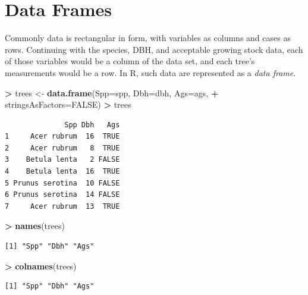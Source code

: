 \documentclass[]{krantz}
\makeatletter
\newenvironment{Shaded}{\begin{snugshade}}{\end{snugshade}}
\newcommand{\KeywordTok}[1]{\textcolor[rgb]{0.27,0.27,0.27}{\textbf{#1}}}
\newcommand{\DataTypeTok}[1]{\textcolor[rgb]{0.27,0.27,0.27}{#1}}
\newcommand{\StringTok}[1]{\textcolor[rgb]{0.5,0.5,0.5}{#1}}
\newcommand{\OtherTok}[1]{\textcolor[rgb]{0.37,0.37,0.37}{#1}}
\newcommand{\OperatorTok}[1]{\textcolor[rgb]{0.43,0.43,0.43}{\textbf{#1}}}
\newcommand{\NormalTok}[1]{#1}
\newenvironment{kframe}{%
\medskip{}
\setlength{\fboxsep}{.8em}
 \def\at@end@of@kframe{}%
 \ifinner\ifhmode%
  \def\at@end@of@kframe{\end{minipage}}%
  \begin{minipage}{\columnwidth}%
 \fi\fi%
 \def\FrameCommand##1{\hskip\@totalleftmargin \hskip-\fboxsep
 \colorbox{shadecolor}{##1}\hskip-\fboxsep
     \hskip-\linewidth \hskip-\@totalleftmargin \hskip\columnwidth}%
 \MakeFramed {\advance\hsize-\width
   \@totalleftmargin\z@ \linewidth\hsize
   \@setminipage}}%
 {\par\unskip\endMakeFramed%
 \at@end@of@kframe}
\renewenvironment{Shaded}{\begin{kframe}}{\end{kframe}}
\theoremstyle{definition}
\theoremstyle{definition}
\theoremstyle{definition}
\theoremstyle{remark}
\makeatother
\begin{document}
\section{Data Frames}\label{data-frames}

Commonly data is rectangular in form, with variables as columns and
cases as rows. Continuing with the species, DBH, and acceptable growing
stock data, each of those variables would be a column of the data set,
and each tree's measurements would be a row. In R, such data are
represented as a \emph{data frame}.

\begin{Shaded}
\begin{Highlighting}[]
\OperatorTok{>}\StringTok{ }\NormalTok{trees <-}\StringTok{ }\KeywordTok{data.frame}\NormalTok{(}\DataTypeTok{Spp=}\NormalTok{spp, }\DataTypeTok{Dbh=}\NormalTok{dbh, }\DataTypeTok{Ags=}\NormalTok{ags, }
\OperatorTok{+}\StringTok{                     }\DataTypeTok{stringsAsFactors=}\OtherTok{FALSE}\NormalTok{)}
\OperatorTok{>}\StringTok{ }\NormalTok{trees}
\end{Highlighting}
\end{Shaded}

\begin{verbatim}
              Spp Dbh   Ags
1     Acer rubrum  16  TRUE
2     Acer rubrum   8  TRUE
3    Betula lenta   2 FALSE
4    Betula lenta  16  TRUE
5 Prunus serotina  10 FALSE
6 Prunus serotina  14 FALSE
7     Acer rubrum  13  TRUE
\end{verbatim}

\begin{Shaded}
\begin{Highlighting}[]
\OperatorTok{>}\StringTok{ }\KeywordTok{names}\NormalTok{(trees)}
\end{Highlighting}
\end{Shaded}

\begin{verbatim}
[1] "Spp" "Dbh" "Ags"
\end{verbatim}

\begin{Shaded}
\begin{Highlighting}[]
\OperatorTok{>}\StringTok{ }\KeywordTok{colnames}\NormalTok{(trees)}
\end{Highlighting}
\end{Shaded}

\begin{verbatim}
[1] "Spp" "Dbh" "Ags"
\end{verbatim}
\end{document}
